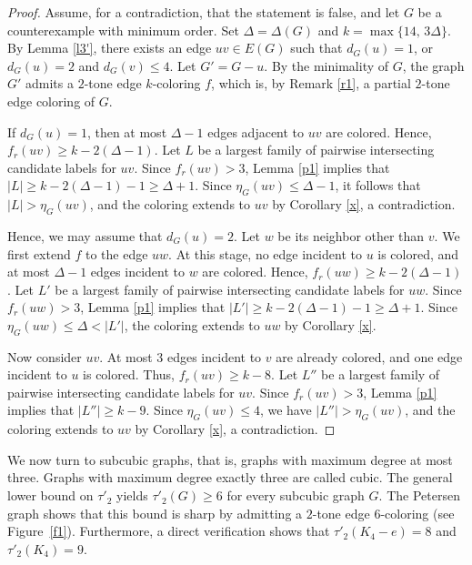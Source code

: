 \documentclass[12pt]{article}
\theoremstyle{plain}
\numberwithin{theorem}{section}
\numberwithin{conjecture}{section}
\numberwithin{corollary}{section}
\numberwithin{example}{section}
\numberwithin{lemma}{section}
\numberwithin{proposition}{section}
\numberwithin{problem}{section}
\numberwithin{remark}{section}
\numberwithin{claim}{theorem}
\numberwithin{definition}{section}
\begin{document}
\begin{proof}
Assume, for a contradiction, that the statement is false, and let $G$ be a counterexample with minimum order. Set $\Delta=\Delta(G)$ and $k=\max\{14,\,3\Delta\}$. By Lemma \ref{l3'}, there exists an edge $uv \in E(G)$ such that $d_G(u)=1$, or $d_G(u)=2$ and $d_G(v)\le 4$. Let $G'=G-u$. By the minimality of $G$, the graph $G'$ admits a $2$-tone edge $k$-coloring $f$, which is, by Remark \ref{r1}, a partial $2$-tone edge coloring of $G$.

\noindent If $d_G(u)=1$, then at most $\Delta-1$ edges adjacent to $uv$ are colored. Hence, $f_r(uv)\ge k-2(\Delta-1)$. Let $L$ be a largest family of pairwise intersecting candidate labels for $uv$. Since $f_r(uv) > 3$, Lemma \ref{p1} implies that $|L| \ge k-2(\Delta-1)-1\ge \Delta +1$. Since $\eta_G(uv)\le \Delta-1$, it follows that $|L|>\eta_G(uv)$, and the coloring extends to $uv$ by Corollary \ref{x}, a contradiction.

\noindent Hence, we may assume that $d_G(u)=2$. Let $w$ be its neighbor other than $v$. We first extend $f$ to the edge $uw$. At this stage, no edge incident to $u$ is colored, and at most $\Delta-1$ edges incident to $w$ are colored. Hence, $f_r(uw)\ge k-2(\Delta-1)$. Let $L'$ be a largest family of pairwise intersecting candidate labels for $uw$. Since $f_r(uw) > 3$, Lemma \ref{p1} implies that $|L'| \ge k-2(\Delta-1)-1\ge \Delta+1$. Since $\eta_G(uw)\le \Delta<|L'|$, the coloring extends to $uw$ by Corollary \ref{x}.

\noindent Now consider $uv$. At most $3$ edges incident to $v$ are already colored, and one edge incident to $u$ is colored. Thus, $f_r(uv)\ge k-8$. Let $L''$ be a largest family of pairwise intersecting candidate labels for $uv$. Since $f_r(uv) > 3$, Lemma \ref{p1} implies that $|L''| \ge k-9$. Since $\eta_G(uv)\le 4$, we have $|L''|>\eta_G(uv)$, and the coloring extends to $uv$ by Corollary \ref{x}, a contradiction.\end{proof}

We now turn to subcubic graphs, that is, graphs with maximum degree at most three. Graphs with maximum degree exactly three are called cubic. The general lower bound on $\tau'_2$ yields $\tau'_2(G)\ge6$ for every subcubic graph $G$. The Petersen graph shows that this bound is sharp by admitting a $2$-tone edge $6$-coloring (see Figure~\ref{f1}). Furthermore, a direct verification shows that $\tau'_2(K_4-e)=8$ and $\tau'_2(K_4)=9$.
\end{document}
